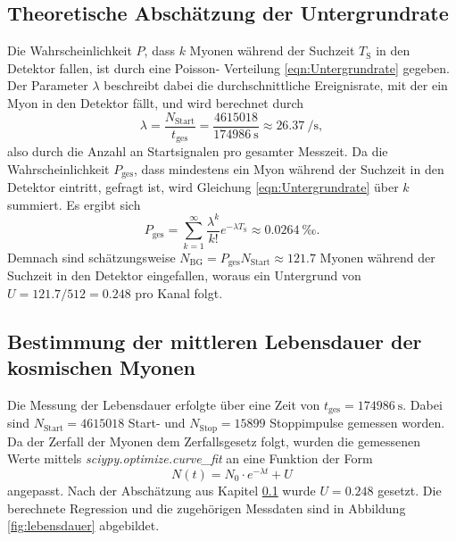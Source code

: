 \subsection{Theoretische Abschätzung der Untergrundrate}
\label{sec:untergrund}
Die Wahrscheinlichkeit $P$, dass $k$ Myonen während der Suchzeit $T_\text{S}$ in den Detektor fallen, ist durch eine Poisson- Verteilung \ref{eqn:Untergrundrate}
gegeben. Der Parameter $\lambda$ beschreibt dabei die durchschnittliche Ereignisrate, mit der ein Myon in den Detektor fällt, und wird berechnet durch
\begin{equation*}
  \lambda=\frac{N_\text{Start}}{t_\text{ges}}=\frac{\num{4615018}}{\SI{174986}{\second}}\approx \SI{26.37}{\per\second},
\end{equation*}
also durch die Anzahl an Startsignalen pro gesamter Messzeit. Da die Wahrscheinlichkeit $P_\text{ges}$, dass mindestens ein Myon während der Suchzeit in den Detektor eintritt,
gefragt ist, wird Gleichung \ref{eqn:Untergrundrate} über $k$ summiert. Es ergibt sich
\begin{equation*}
  P_{\text{ges}}=\sum_{k=1}^\infty\frac{\lambda^k}{k!}e^{-\lambda T_\text{S}}\approx\SI{0.0264}{‰}.
\end{equation*}
Demnach sind schätzungsweise $N_{\text{BG}}=P_{\text{ges}}N_{\text{Start}}\approx\num{121.7}$ Myonen während der Suchzeit in den Detektor eingefallen, woraus ein Untergrund
von $U=\num{121.7}/\num{512}=\num{0.248}$ pro Kanal folgt.

\subsection{Bestimmung der mittleren Lebensdauer der kosmischen Myonen}
\label{sec:lebensdauer}
Die Messung der Lebensdauer erfolgte über eine Zeit von $t_\text{ges}=\SI{174986}{\second}$. Dabei sind $N_\text{Start}=\num{4615018}$ Start- und  $N_\text{Stop}=\num{15899}$
Stoppimpulse gemessen worden.
\noindent
Da der Zerfall der Myonen dem Zerfallsgesetz folgt, wurden die gemessenen Werte mittels \textit{sciypy.optimize.curve\_fit} an eine Funktion der Form 
\begin{equation}
  N(t)=N_0\cdot e^{-\lambda t}+U \label{eqn:expo}
\end{equation}
angepasst. Nach der Abschätzung aus Kapitel \ref{sec:untergrund} wurde $U=0.248$ gesetzt. Die berechnete Regression und die zugehörigen Messdaten sind in Abbildung 
\ref{fig:lebensdauer} abgebildet.

